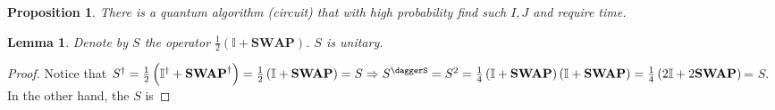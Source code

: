 \documentclass{article}
\newtheorem{lemma}[theorem]{Lemma}
\newtheorem{proposition}[theorem]{Proposition}
\begin{document}
\begin{proposition}
    There is a quantum algorithm (circuit) that with high probability find such \(I,J\) and require  time.   
\end{proposition}

\begin{lemma}
    Denote by \(S\) the operator \( \frac{1}{2}\left(\mathbb{I} + \mathbf{SWAP} \right) \). \( S\) is unitary.  
\end{lemma}
\begin{proof}
    Notice that \(S^\dagger = \frac{1}{2}\left(\mathbb{I}^\dagger + \mathbf{SWAP}^\dagger \right) = \frac{1}{2}\left(\mathbb{I} + \mathbf{SWAP} \right) = S \Rightarrow S^\daggerS  = S^2=\frac{1}{4}\left(\mathbb{I} + \mathbf{SWAP} \right)\left(\mathbb{I} + \mathbf{SWAP} \right) = \frac{1}{4}\left(2\mathbb{I} + 2\mathbf{SWAP} \right)\)= \( S\). In the other hand, the \(S\) is 
\end{proof}
\end{document}
